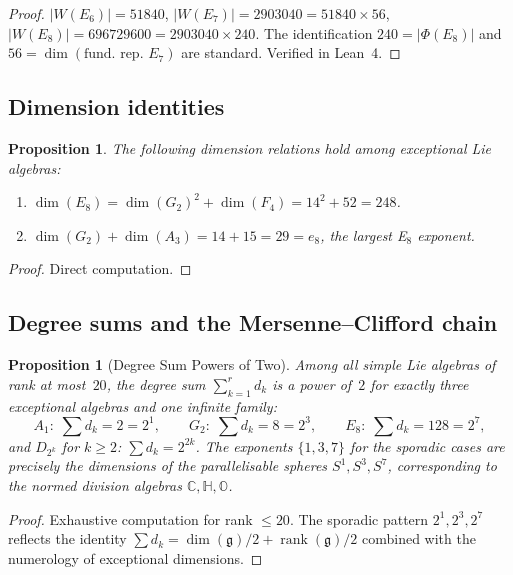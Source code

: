 \documentclass[11pt]{amsart}
\theoremstyle{plain}
\newtheorem{proposition}[theorem]{Proposition}
\theoremstyle{definition}
\theoremstyle{remark}
\newcommand{\fg}{\mathfrak{g}}
\renewcommand{\Phi}{\varPhi}
\newcommand{\rank}{\operatorname{rank}}
\begin{document}
\begin{proof}
$|W(E_6)| = 51840$, $|W(E_7)| = 2903040 = 51840 \times 56$,
$|W(E_8)| = 696729600 = 2903040 \times 240$.  The identification
$240 = |\Phi(E_8)|$ and $56 = \dim(\text{fund.\ rep.\ } E_7)$ are
standard.  Verified in Lean~4.
\end{proof}

\subsection{Dimension identities}

\begin{proposition}\label{prop:dim-identities}
The following dimension relations hold among exceptional Lie algebras:
\begin{enumerate}[\upshape(i)]
  \item $\dim(E_8) = \dim(G_2)^2 + \dim(F_4) = 14^2 + 52 = 248$.
  \item $\dim(G_2) + \dim(A_3) = 14 + 15 = 29 = e_8$, the largest E$_8$ exponent.
\end{enumerate}
\end{proposition}

\begin{proof}
Direct computation.
\end{proof}

\subsection{Degree sums and the Mersenne--Clifford chain}

\begin{proposition}[Degree Sum Powers of Two]\label{prop:degree-sum-pow2}
Among all simple Lie algebras of rank at most~$20$, the degree sum
$\sum_{k=1}^{r} d_k$ is a power of~$2$ for exactly three exceptional
algebras and one infinite family:
\[
  A_1: \; \sum d_k = 2 = 2^1, \qquad
  G_2: \; \sum d_k = 8 = 2^3, \qquad
  E_8: \; \sum d_k = 128 = 2^7,
\]
and $D_{2^k}$ for $k \ge 2$: $\sum d_k = 2^{2k}$.
The exponents $\{1, 3, 7\}$ for the sporadic cases are precisely the
dimensions of the parallelisable spheres $S^1, S^3, S^7$, corresponding
to the normed division algebras $\mathbb{C}, \mathbb{H}, \mathbb{O}$.
\end{proposition}

\begin{proof}
Exhaustive computation for rank $\le 20$.  The sporadic pattern
$2^1, 2^3, 2^7$ reflects the identity
$\sum d_k = \dim(\fg)/2 + \rank(\fg)/2$ combined with the
numerology of exceptional dimensions.
\end{proof}
\end{document}
